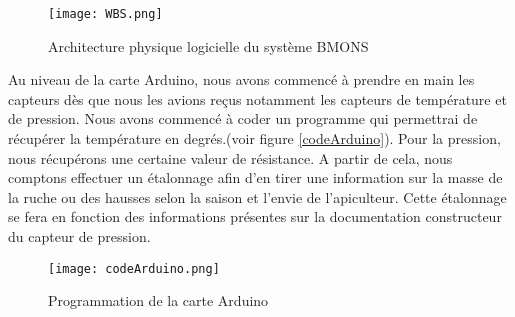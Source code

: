 \begin{figure}[h!]
\centering\texttt{[image: WBS.png]}
\caption{\label{fig:SDP} Architecture physique logicielle du système BMONS}
\end{figure}

Au niveau de la carte Arduino, nous avons commencé à prendre en main les capteurs dès que nous les avions reçus notamment les capteurs de température et de pression. Nous avons commencé à coder un programme qui permettrai de récupérer la température en degrés.(voir figure \ref{codeArduino}). Pour la pression, nous récupérons une certaine valeur de résistance. A partir de cela, nous comptons effectuer un étalonnage afin d'en tirer une information sur la masse de la ruche ou des hausses selon la saison et l'envie de l'apiculteur. Cette étalonnage se fera en fonction des informations présentes sur la documentation constructeur du capteur de pression.

\begin{figure}[h!]
\centering\texttt{[image: codeArduino.png]}
\caption{\label{fig:codeArduino} Programmation de la carte Arduino}
\end{figure}  

\clearpage